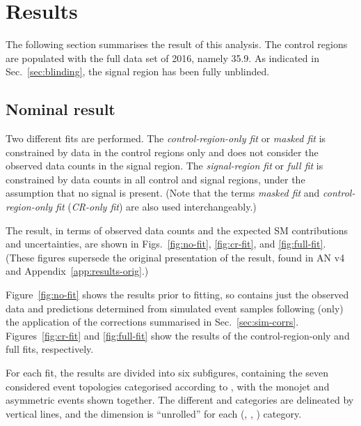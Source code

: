 \section{Results}
\label{sec:results}

The following section summarises the result of this analysis. The
control regions are populated with the full data set of 2016, namely
35.9\fbinv. As indicated in Sec.~\ref{sec:blinding}, the signal region
has been fully unblinded.

\subsection{Nominal result}
\label{sec:nominal-result}

Two different fits are performed. The {\it control-region-only fit} or
{\it masked fit} is constrained by data in the control regions only
and does not consider the observed data counts in the signal
region. The {\it signal-region fit} or {\it full fit} is constrained
by data counts in all control and signal regions, under the assumption
that no signal is present.  (Note that the terms {\it masked fit} and
{\it control-region-only fit} ({\it CR-only fit}) are also used
interchangeably.)

The result, in terms of observed data counts and the expected SM
contributions and uncertainties, are shown in Figs.~\ref{fig:no-fit},
\ref{fig:cr-fit}, and \ref{fig:full-fit}. (These figures supersede the
original presentation of the result, found in AN v4 and
Appendix~\ref{app:results-orig}.)

Figure~\ref{fig:no-fit} shows the results prior to fitting, so
contains just the observed data and predictions determined from
simulated event samples following (only) the application of the
corrections summarised in
Sec.~\ref{sec:sim-corrs}. Figures~\ref{fig:cr-fit} and
\ref{fig:full-fit} show the results of the control-region-only and
full fits, respectively.

For each fit, the results are divided into six subfigures, containing
the seven considered event topologies categorised according to \njet,
with the monojet and asymmetric events shown together. The different
\nb and \scalht categories are delineated by vertical lines, and the
\mht dimension is ``unrolled'' for each (\njet, \nb, \scalht)
category.

